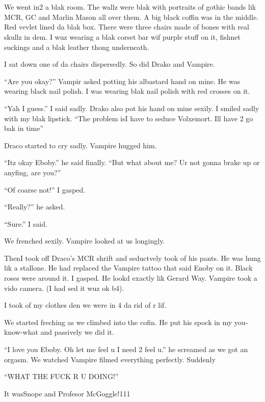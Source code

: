 \section{}



We went in2 a blak room. The wallz were blak with portraits of gothic bands lik MCR, GC and Marlin Mason all over them. A big black coffin was in the middle. Red vevlet lined da blak box. There were three chairs made of bones with real skullz in dem. I wuz wearing a blak corset bar wif purple stuff on it, fishnet suckings and a blak leather thong underneath.

I sat down one of da chairs dispersedly. So did Drako and Vampire.

\enquote{Are you okay?} Vampir asked potting his albastard hand on mine. He was wearing black nail polish. I was wearing blak nail polish with red crosses on it.

\enquote{Yah I guess.} I said sadly. Drako also pot his hand on mine sexily. I smiled sadly with my blak lipstick. \enquote{The problem is\dotfill\newline\phantom{}\dotfill I have to seduce Volxemort. Ill have 2 go bak in time}

Draco started to cry sadly. Vampire hugged him.

\enquote{Itz okay Eboby.} he said finally. \enquote{But what about me? Ur not gonna brake up or anyfing, are you?}

\enquote{Of coarse not!} I gasped.

\enquote{Really?} he asked.

\enquote{Sure.} I said.

We frenched sexily. Vampire looked at us longingly.

Then\dotfill I took off Draco's MCR shrift and seductvely\newline
took of his pants. He was hung lik a stallone. He had replaced the Vampire tattoo that said Enoby on it. Black roses were around it. I gasped. He lookd exactly lik Gerard Way. Vampire took a vido camera. (I had sed it wuz ok b4).

I took of my clothes den we were in 4 da rid of r lif.

We started freching as we climbed into the cofin. He put his spock in my you-know-what and passively we did it.

\enquote{I love you Eboby. Oh let me feel u I need 2 feel u.} he screamed as we got an orgasm. We watched Vampire filmed everything perfectly. Suddenly\dotfill

\enquote{WHAT THE FUCK R U DOING!}

It was\dotfill Snope and Profesor McGoggle!111
